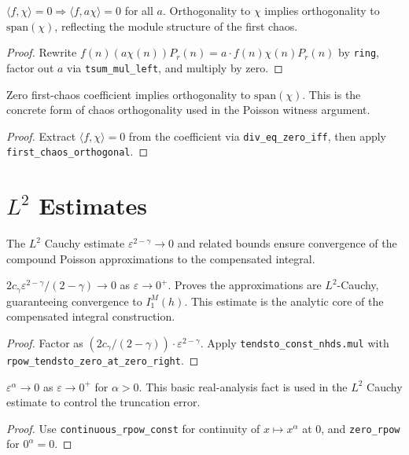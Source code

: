 \begin{theorem}\label{thm:first_chaos}
\leanok
{}
$\langle f, \chi \rangle = 0 \Rightarrow \langle f, a\chi \rangle = 0$ for all $a$.
Orthogonality to $\chi$ implies orthogonality to $\mathrm{span}(\chi)$, reflecting the module structure of the first chaos.
\end{theorem}
\begin{proof}\leanok Rewrite $f(n)(a\chi(n))P_r(n) = a \cdot f(n)\chi(n)P_r(n)$ by \texttt{ring}, factor out $a$ via \texttt{tsum\_mul\_left}, and multiply by zero.\end{proof}

\begin{theorem}\label{thm:chaos_concrete}
\leanok
{}
Zero first-chaos coefficient implies orthogonality to $\mathrm{span}(\chi)$.
This is the concrete form of chaos orthogonality used in the Poisson witness argument.
\end{theorem}
\begin{proof}\leanok Extract $\langle f, \chi \rangle = 0$ from the coefficient via \texttt{div\_eq\_zero\_iff}, then apply \texttt{first\_chaos\_orthogonal}.\end{proof}

\section{$L^2$ Estimates}

The $L^2$ Cauchy estimate $\varepsilon^{2-\gamma} \to 0$ and related bounds ensure convergence of the compound Poisson approximations to the compensated integral.

\begin{theorem}\label{thm:l2_cauchy}
\leanok
$2c_\gamma \varepsilon^{2-\gamma}/(2-\gamma) \to 0$ as $\varepsilon \to 0^+$.
Proves the approximations are $L^2$-Cauchy, guaranteeing convergence to $I_1^M(h)$.
This estimate is the analytic core of the compensated integral construction.
\end{theorem}
\begin{proof}\leanok Factor as $(2c_\gamma/(2-\gamma)) \cdot \varepsilon^{2-\gamma}$. Apply \texttt{tendsto\_const\_nhds.mul} with \texttt{rpow\_tendsto\_zero\_at\_zero\_right}.\end{proof}

\begin{theorem}\label{thm:rpow_zero}
\leanok
$\varepsilon^\alpha \to 0$ as $\varepsilon \to 0^+$ for $\alpha > 0$.
This basic real-analysis fact is used in the $L^2$ Cauchy estimate to control the truncation error.
\end{theorem}
\begin{proof}\leanok Use \texttt{continuous\_rpow\_const} for continuity of $x \mapsto x^\alpha$ at $0$, and \texttt{zero\_rpow} for $0^\alpha = 0$.\end{proof}

